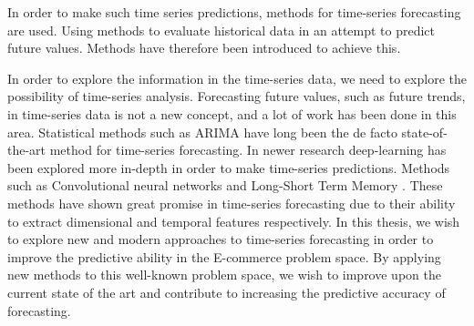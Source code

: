 In order to make such time series predictions, methods for time-series forecasting are used.
Using methods to evaluate historical data in an attempt to predict future values.
Methods have therefore been introduced to achieve this.


\iffalse



  In order to explore the information in the time-series data, we need to explore the possibility of time-series analysis.
  Forecasting future values, such as future trends, in time-series data is not a new concept, and a lot of work has been done in this area.
  Statistical methods such as ARIMA have long been the de facto state-of-the-art method for time-series forecasting.
  In newer research deep-learning has been explored more in-depth in order to make time-series predictions.
  Methods such as Convolutional neural networks  and Long-Short Term Memory .
  These methods have shown great promise in time-series forecasting due to their ability to extract dimensional and temporal features respectively.
  In this thesis, we wish to explore new and modern approaches to time-series forecasting in order to improve the predictive ability in the E-commerce problem space.
  By applying new methods to this well-known problem space, we wish to improve upon the current state of the art and contribute to increasing the predictive accuracy of forecasting.



